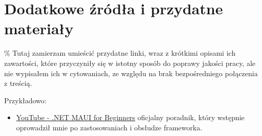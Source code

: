 \section{Dodatkowe źródła i przydatne materiały}
\% Tutaj zamierzam umieścić przydatne linki, wraz z krótkimi opisami ich zawartości,
które przyczyniły się w istotny sposób do poprawy jakości pracy, ale nie wypisałem ich w cytowaniach,
ze względu na brak bezpośredniego połączenia z treścią.

Przykładowo:

\begin{itemize}
    \item \href{https://www.youtube.com/playlist?list=PLdo4fOcmZ0oUBAdL2NwBpDs32zwGqb9DY}{YouTube - .NET MAUI for Beginners} 
        oficjalny poradnik, który wstępnie oprowadził mnie po zastosowaniach i obsłudze frameworka.
\end{itemize}
